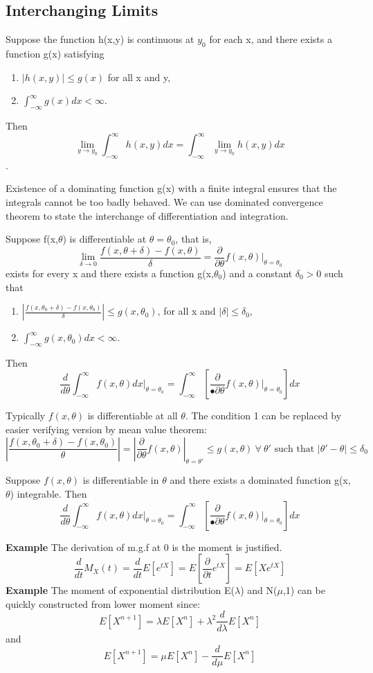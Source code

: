 \documentclass[../Transformation.tex]{subfiles}
\begin{document}
\subsection{Interchanging Limits}
\begin{theorem}Suppose the function h(x,y) is continuous at $y_0$ for each x, and there exists a function g(x) satisfying
\begin{enumerate}
\item $|h(x,y)|\leq g(x)$ for all x and y,
\item $\int_{-\infty}^\infty g(x)dx<\infty$.
\end{enumerate}
Then $$\lim_{y\rightarrow y_0}\int_{-\infty}^\infty h(x,y)dx=\int_{-\infty}^\infty \lim_{y\rightarrow y_0}h(x,y)dx$$.
\end{theorem}
Existence of a dominating function g(x) with a finite integral ensures that the integrals cannot be too badly behaved. We can use dominated convergence theorem to state the interchange of differentiation and integration.
\begin{theorem}Suppose f(x,$\theta$) is differentiable at $\theta=\theta_0$, that is, 
$$\lim_{\delta\rightarrow0}\frac{f(x,\theta+\delta)-f(x,\theta)}{\delta}=\frac{\partial}{\partial\theta}f(x,\theta)|_{\theta=\theta_0}$$ exists for every x and there exists a function g(x,$\theta_0$) and a constant $\delta_0>0$ such that
\begin{enumerate}
\item $|\frac{f(x,\theta_0+\delta)-f(x,\theta_0)}{\delta}|\leq g(x,\theta_0)$, for all x and $|\delta|\leq\delta_0$,
\item $\int_{-\infty}^\infty g(x,\theta_0)dx<\infty$.
\end{enumerate}
Then $$\frac{d}{d\theta}\int_{-\infty}^{\infty}f(x,\theta)dx|_{\theta=\theta_0}=\int_{-\infty}^{\infty}[\frac{\partial}{•\partial\theta}f(x,\theta)|_{\theta=\theta_0}]dx$$
\end{theorem}
Typically $f(x,\theta)$ is differentiable at all $\theta$. The condition 1 can be replaced by easier verifying version by mean value theorem:
$$|\frac{f(x,\theta_0+\delta)-f(x,\theta_0)}{\theta}|=|\frac{\partial}{\partial\theta}f(x,\theta)|_{\theta=\theta'}\leq g(x,\theta)\ \forall\ \theta' \text{ such that $|\theta '-\theta |\leq\delta_0$}$$ 
\begin{corollary}
Suppose $f(x,\theta)$ is differentiable in $\theta$ and there exists a dominated function g(x,$\theta$) integrable.
Then $$\frac{d}{d\theta}\int_{-\infty}^{\infty}f(x,\theta)dx|_{\theta=\theta_0}=\int_{-\infty}^{\infty}[\frac{\partial}{•\partial\theta}f(x,\theta)|_{\theta=\theta_0}]dx$$
\end{corollary} 
{\bf Example} The derivation of m.g.f at 0 is the moment is justified.
$$\frac{d}{dt}M_X(t)=\frac{d}{dt}E[e^{tX}]=E[\frac{\partial}{\partial t}e^{tX}]=E[Xe^{tX}]$$ 
{\bf Example} The moment of exponential distribution E($\lambda$) and N($\mu$,1) can be quickly constructed from lower moment since:
$$E[X^{n+1}]=\lambda E[X^n]+\lambda^2\frac{d}{d\lambda}E[X^n]$$ and $$E[X^{n+1}]=\mu E[X^n]-\frac{d}{d\mu}E[X^n]$$
\end{document}
